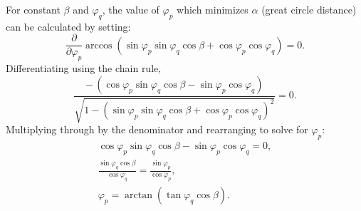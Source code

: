 For constant $\beta$ and $\varphi_q$, the value of $\varphi_p$ which minimizes $\alpha$ (great circle distance) can be calculated by setting:
\begin{equation}
    \frac{\partial}{\partial \varphi_p}
    \arccos\left(\sin\varphi_p\sin\varphi_q\cos\beta
    +\cos\varphi_p\cos\varphi_q\right)
    =0.\label{eq:mimimum}
\end{equation}
Differentiating using the chain rule,
\begin{equation}
    \frac{-\,(\cos\varphi_p\sin\varphi_q
    \cos\beta-\sin\varphi_p\cos\varphi_q)}
    {\sqrt{1-{(\sin\varphi_p\sin\varphi_q\cos\beta
    +\cos\varphi_p\cos\varphi_q)}^2}}
    =0.\label{eq:derivative}
\end{equation}
Multiplying through by the denominator and rearranging to solve for $\varphi_p$:
\begin{gather}
    \cos\varphi_p\sin\varphi_q
    \cos\beta-\sin\varphi_p\cos\varphi_q
    =0,\nonumber\\
    \frac{\sin\varphi_q
    \cos\beta}
    {\cos\varphi_q}
    =\frac{\sin\varphi_p}{\cos\varphi_p},\nonumber\\
    \varphi_p
    =\arctan(\tan\varphi_q
    \cos\beta).
    \label{eq:ze'}
\end{gather}

